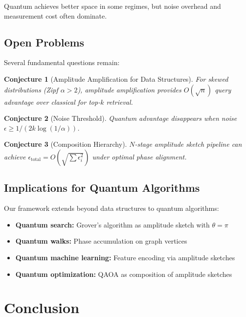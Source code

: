 \documentclass[11pt,letterpaper]{article}
\newtheorem{conjecture}{Conjecture}
\begin{document}
Quantum achieves better space in some regimes, but noise overhead and measurement cost often dominate.

\subsection{Open Problems}

Several fundamental questions remain:

\begin{conjecture}[Amplitude Amplification for Data Structures]
For skewed distributions (Zipf $\alpha > 2$), amplitude amplification provides $O(\sqrt{n})$ query advantage over classical for top-$k$ retrieval.
\end{conjecture}

\begin{conjecture}[Noise Threshold]
Quantum advantage disappears when noise $\epsilon \geq 1/(2k \log(1/\alpha))$.
\end{conjecture}

\begin{conjecture}[Composition Hierarchy]
$N$-stage amplitude sketch pipeline can achieve $\epsilon_{\text{total}} = O(\sqrt{\sum \epsilon_i^2})$ under optimal phase alignment.
\end{conjecture}

\subsection{Implications for Quantum Algorithms}

Our framework extends beyond data structures to quantum algorithms:

\begin{itemize}
\item \textbf{Quantum search:} Grover's algorithm as amplitude sketch with $\theta = \pi$
\item \textbf{Quantum walks:} Phase accumulation on graph vertices
\item \textbf{Quantum machine learning:} Feature encoding via amplitude sketches
\item \textbf{Quantum optimization:} QAOA as composition of amplitude sketches
\end{itemize}

\section{Conclusion}
\label{sec:conclusion}
\end{document}
